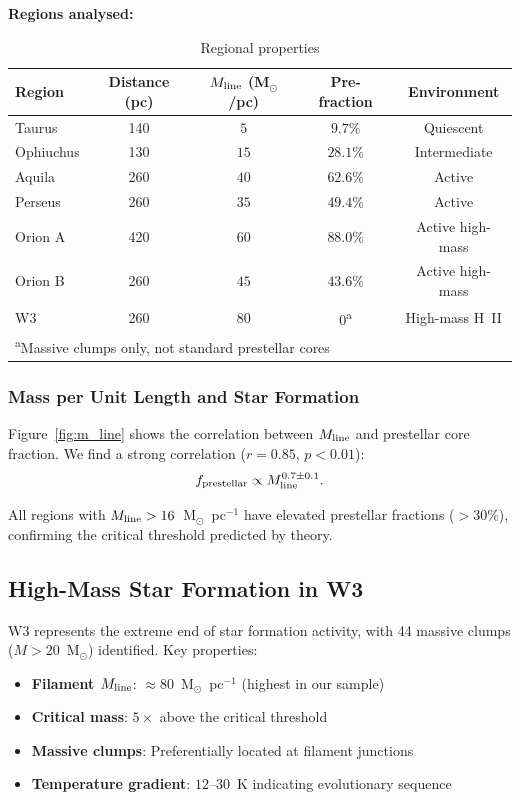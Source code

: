 \documentclass{mnras}
\begin{document}
\textbf{Regions analysed:}
\begin{table}[h]
\centering
\caption{Regional properties}
\begin{tabular}{lcccc}
Region & Distance (pc) & $M_{\rm line}$ (M$_\odot$/pc) & Pre-\* fraction & Environment \\
\hline
Taurus & 140 & $5$ & $9.7\%$ & Quiescent \\
Ophiuchus & 130 & $15$ & $28.1\%$ & Intermediate \\
Aquila & 260 & $40$ & $62.6\%$ & Active \\
Perseus & 260 & $35$ & $49.4\%$ & Active \\
Orion A & 420 & $60$ & $88.0\%$ & Active high-mass \\
Orion B & 260 & $45$ & $43.6\%$ & Active high-mass \\
W3 & 260 & $80$ & $0$\textsuperscript{a} & High-mass H~II \\
\hline
\multicolumn{5}{l}{\footnotesize \textsuperscript{a}Massive clumps only, not standard prestellar cores}
\end{tabular}
\end{table}

\subsubsection{Mass per Unit Length and Star Formation}

Figure~\ref{fig:m_line} shows the correlation between $M_{\rm line}$ and prestellar core fraction. We find a strong correlation ($r = 0.85$, $p < 0.01$):
\begin{equation}
f_{\rm prestellar} \propto M_{\rm line}^{0.7 \pm 0.1}.
\end{equation}

All regions with $M_{\rm line} > 16$~M$_\odot$~pc$^{-1}$ have elevated prestellar fractions ($>30\%$), confirming the critical threshold predicted by theory.

\subsection{High-Mass Star Formation in W3}

W3 represents the extreme end of star formation activity, with 44 massive clumps ($M > 20$~M$_\odot$) identified. Key properties:
\begin{itemize}
  \item \textbf{Filament $M_{\rm line}$}: $\approx 80$~M$_\odot$~pc$^{-1}$ (highest in our sample)
  \item \textbf{Critical mass}: $5\times$ above the critical threshold
  \item \textbf{Massive clumps}: Preferentially located at filament junctions
  \item \textbf{Temperature gradient}: $12$--$30$~K indicating evolutionary sequence
\end{itemize}
\end{document}
